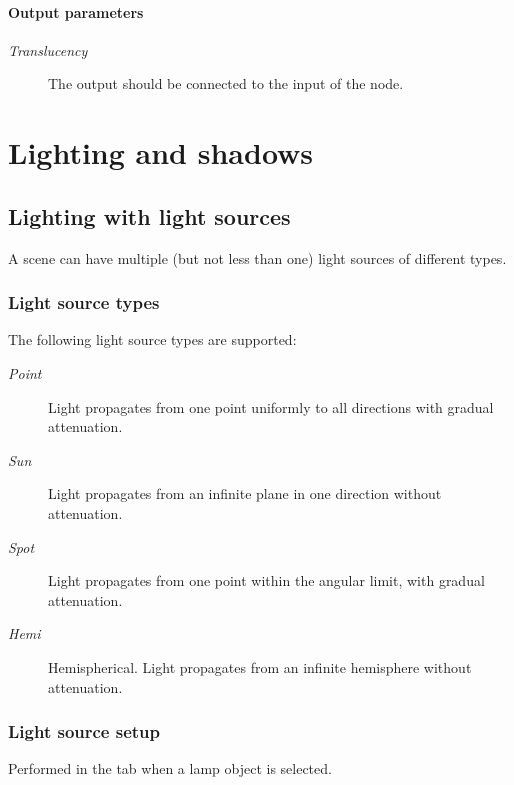 \documentclass[a4paper,12pt,oneside]{sphinxmanual}
\begin{document}
\subsubsection{Output parameters}
\label{node_materials:id7}\begin{description}
\item[{\emph{Translucency}}] \leavevmode
The output should be connected to the  input of the  node.

\end{description}
\label{lighting:lighting}

\chapter{Lighting and shadows}
\label{lighting:index-0}\label{lighting::doc}\label{lighting:id1}

\section{Lighting with light sources}
\label{lighting:id2}\label{lighting:index-1}
A scene can have multiple (but not less than one) light sources of different types.


\subsection{Light source types}
\label{lighting:id3}
The following light source types are supported:
\begin{description}
\item[{\emph{Point}}] \leavevmode
Light propagates from one point uniformly to all directions with gradual attenuation.

\item[{\emph{Sun}}] \leavevmode
Light propagates from an infinite plane in one direction without attenuation.

\item[{\emph{Spot}}] \leavevmode
Light propagates from one point within the angular limit, with gradual attenuation.

\item[{\emph{Hemi}}] \leavevmode
Hemispherical. Light propagates from an infinite hemisphere without attenuation.

\end{description}


\subsection{Light source setup}
\label{lighting:id4}
Performed in the  tab when a lamp object is selected.
\end{document}
